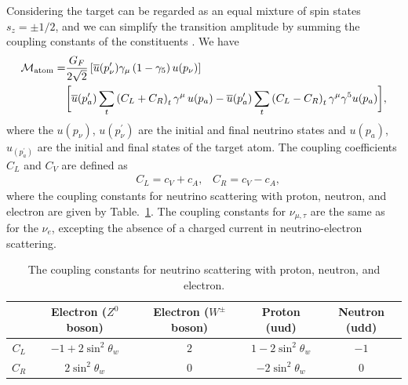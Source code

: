Considering the target can be regarded as an equal mixture of spin states $s_z=\pm1/2$, and we can simplify the transition amplitude by summing the coupling constants of the constituents \cite{Lewis:1979mu,Sehgal:1986gn}. We have
\begin{align}
\label{Transition}
\mathcal{M}_\mathrm{atom}=&\frac{G_F}{2\sqrt{2}}\left[\overline{u}(p^\prime_\nu)\gamma_\mu\left(1-\gamma_5\right)u(p_\nu)\right]\notag\\&\bigg[\overline{u}(p^\prime_{a})\sum_t\left(C_L+C_R\right)_t\gamma^\mu\,u(p_{a})-\overline{u}(p^\prime_{a})\sum_t\left(C_L-C_R\right)_t\gamma^\mu\gamma^5u(p_{a})\bigg],
\end{align}
where the $u(p_\nu)$, $u(p^\prime_\nu)$ are the initial and final neutrino states and $u(p_a)$, $u_(p^\prime_a)$ are the initial and final states of the target atom. 
The coupling coefficients $C_L$ and $C_V$ are defined as
\begin{align}
&C_L=c_V+c_A,\,\,\,\,\,C_R=c_V-c_A,
\end{align}
where the coupling constants for neutrino scattering with proton, neutron, and electron are given by Table.~\ref{Table_coupling}. The coupling constants for  $\nu_{\mu,\tau}$ are the same as for the $\nu_e$, excepting  the absence  of a charged current in neutrino-electron scattering.
\begin{table}[ht]
\begin{tabular}[c]{c|c|c|c|c}
\hline\hline
& Electron ($Z^0$ boson) & Electron ($W^\pm$ boson) & Proton (uud) & Neutron (udd)\\
\hline
$C_L$ & $-1+2\sin^2\theta_w$ & $2$ & $1-2\sin^2\theta_w$ & $-1$ \\
\hline
$C_R$ & $2\sin^2\theta_w$ & $0$ &$-2\sin^2\theta_w$ & $0$ \\
\hline\hline
\end{tabular}
\caption{The coupling constants for neutrino scattering with proton, neutron, and electron.}
\label{Table_coupling}  
\end{table}

